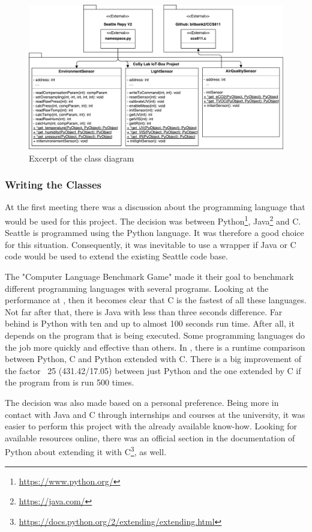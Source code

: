 \documentclass[bachelorthesis, grey, english]{mas-thesis-chapters} %
\begin{document}
\begin{figure}[ht]
	\centering
	\includegraphics[width=13.5cm]{Class_Diagram_Cropped.pdf}
	\caption{Excerpt of the class diagram}
	\label{fig:classDiagram}
\end{figure}

\subsubsection{Writing the Classes}

At the first meeting there was a discussion about the programming language that would be used for this project. The decision was between Python\footnote{\url{https://www.python.org/}}, Java\footnote{\url{https://java.com/}} and C. Seattle is programmed using the Python language. It was therefore a good choice for this situation. Consequently, it was inevitable to use a wrapper if Java or C code would be used to extend the existing Seattle code base. 

The "Computer Language Benchmark Game" made it their goal to benchmark different programming languages with several programs. Looking at the performance at \cite{speedComp}, then it becomes clear that C is the fastest of all these languages. Not far after that, there is Java with less than three seconds difference. Far behind is Python with ten and up to almost 100 seconds run time. After all, it depends on the program that is being executed. Some programming languages do the job more quickly and effective than others. In \cite[54]{pythonC}, there is a runtime comparison between Python, C and Python extended with C. There is a big improvement of the factor ~25 (431.42/17.05) between just Python and the one extended by C if the program from \cite{pythonC} is run 500 times.

The decision was also made based on a personal preference. Being more in contact with Java and C through internships and courses at the university, it was easier to perform this project with the already available know-how. Looking for available resources online, there was an official section in the documentation of Python about extending it with C\footnote{\url{https://docs.python.org/2/extending/extending.html}}, as well.
\end{document}
